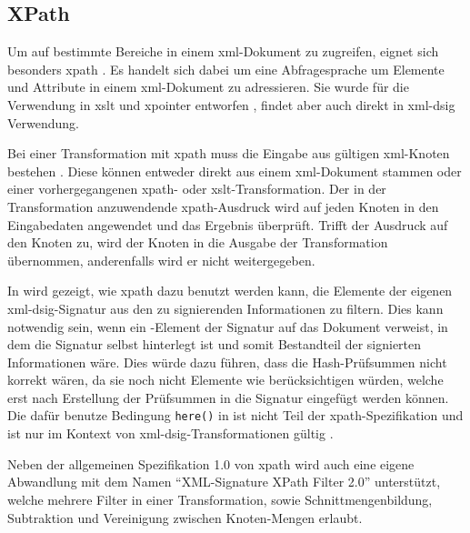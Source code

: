 \subsection{XPath}
\label{sec:XML-DSig:Transformationen:XPath}
Um auf bestimmte Bereiche in einem \gls{xml}-Dokument zu zugreifen, eignet sich besonders \gls{xpath} \cite{xml:oreilly}. Es handelt sich dabei um eine
Abfragesprache um Elemente und Attribute in einem \gls{xml}-Dokument zu adressieren. Sie wurde für die Verwendung in \gls{xslt} und \gls{xpointer} entworfen
\cite{xpath:w3c}, findet aber auch direkt in \gls{xml-dsig} Verwendung.

Bei einer Transformation mit \gls{xpath} muss die Eingabe aus gültigen \gls{xml}-Knoten bestehen \cite{xml-dsig:w3c}. Diese können entweder direkt aus einem
\gls{xml}-Dokument stammen oder einer vorhergegangenen \gls{xpath}- oder \gls{xslt}-Transformation. Der in der Transformation anzuwendende \gls{xpath}-Ausdruck
wird auf jeden Knoten in den Eingabedaten angewendet und das Ergebnis überprüft. Trifft der Ausdruck auf den Knoten zu, wird der Knoten in die Ausgabe der
Transformation übernommen, anderenfalls wird er nicht weitergegeben.



In  wird gezeigt, wie \gls{xpath} dazu benutzt werden kann, die Elemente der eigenen \gls{xml-dsig}-Signatur aus den zu
signierenden Informationen zu filtern. Dies kann notwendig sein, wenn ein -Element der Signatur auf das Dokument verweist, in dem die
Signatur selbst hinterlegt ist und somit Bestandteil der signierten Informationen wäre. Dies würde dazu führen, dass die Hash-Prüfsummen nicht korrekt wären, da
sie noch nicht Elemente wie  berücksichtigen würden, welche erst nach Erstellung der Prüfsummen in die Signatur eingefügt werden können.
Die dafür benutze Bedingung \texttt{here()} in  ist nicht Teil der \gls{xpath}-Spezifikation und ist nur im Kontext
von \gls{xml-dsig}-Transformationen gültig \cite{xml-dsig:w3c}.

Neben der allgemeinen Spezifikation 1.0 von \gls{xpath} \cite{xpath:w3c} wird auch eine eigene Abwandlung mit dem Namen "`XML-Signature XPath Filter 2.0"'
\cite{xml-dsig-filter:w3c} unterstützt, welche mehrere Filter in einer Transformation, sowie Schnittmengenbildung, Subtraktion und Vereinigung zwischen
Knoten-Mengen erlaubt.

